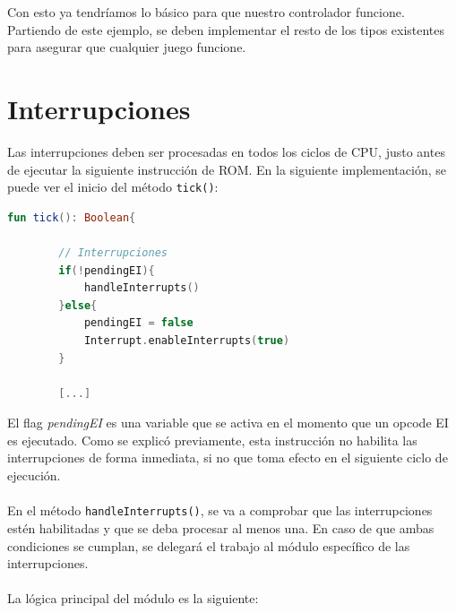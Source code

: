 Con esto ya tendríamos lo básico para que nuestro controlador funcione. Partiendo de este ejemplo, se deben implementar el resto de los tipos existentes para asegurar que cualquier juego funcione.

\section{Interrupciones}

Las interrupciones deben ser procesadas en todos los ciclos de CPU, justo antes de ejecutar la siguiente instrucción de ROM. En la siguiente implementación, se puede ver el inicio del método \texttt{tick()}:

\begin{lstlisting}[language=Kotlin, caption={Interrupciones en el método principal de la CPU.}, label={code:cpuhandleinterrupt}]
    fun tick(): Boolean{

        // Interrupciones
        if(!pendingEI){
            handleInterrupts()
        }else{
            pendingEI = false
            Interrupt.enableInterrupts(true)
        }

        [...]
\end{lstlisting}

El flag \textit{pendingEI} es una variable que se activa en el momento que un opcode EI es ejecutado. Como se explicó previamente, esta instrucción no habilita las interrupciones de forma inmediata, si no que toma efecto en el siguiente ciclo de ejecución.
\\\\
En el método \texttt{handleInterrupts()}, se va a comprobar que las interrupciones estén habilitadas y que se deba procesar al menos una. En caso de que ambas condiciones se cumplan, se delegará el trabajo al módulo específico de las interrupciones.
\\\\
La lógica principal del módulo es la siguiente:

